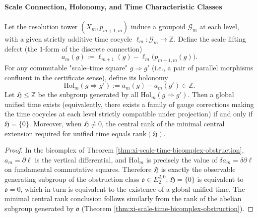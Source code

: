 \paragraph{Scale Connection, Holonomy, and Time Characteristic Classes}

\begin{theorem}\label{thm:xi-scale-time-connection-holonomy-criterion}
Let the resolution tower \((X_m,p_{m+1,m})\) induce a groupoid \(\mathcal G_m\) at each level, with a given strictly additive time cocycle \(\ell_m:\mathcal G_m\to\mathbb Z\).
Define the scale lifting defect (the \(1\)-form of the discrete connection)
\[
a_m(g):=\ell_{m+1}(g)-\ell_m\!\bigl(p_{m+1,m}(g)\bigr).
\]
For any commutable "scale--time square" \(g\Rightarrow g'\) (i.e., a pair of parallel morphisms confluent in the certificate sense), define its holonomy
\[
\mathrm{Hol}_m(g\Rightarrow g'):=a_m(g)-a_m(g')\in\mathbb Z.
\]
Let \(\mathfrak H\le \mathbb Z\) be the subgroup generated by all \(\mathrm{Hol}_m(g\Rightarrow g')\).
Then a global unified time exists (equivalently, there exists a family of gauge corrections making the time cocycles at each level strictly compatible under projection) if and only if \(\mathfrak H=\{0\}\).
Moreover, when \(\mathfrak H\neq 0\), the central rank of the minimal central extension required for unified time equals \(\mathrm{rank}(\mathfrak H)\).
\end{theorem}

\begin{proof}
In the bicomplex of Theorem \ref{thm:xi-scale-time-bicomplex-obstruction}, \(a_m=\partial\ell\) is the vertical differential, and \(\mathrm{Hol}_m\) is precisely the value of \(\delta a_m=\delta\partial\ell\) on fundamental commutative squares.
Therefore \(\mathfrak H\) is exactly the observable generating subgroup of the obstruction class \(\mathfrak o\in E_2^{2,0}\); \(\mathfrak H=\{0\}\) is equivalent to \(\mathfrak o=0\), which in turn is equivalent to the existence of a global unified time.
The minimal central rank conclusion follows similarly from the rank of the abelian subgroup generated by \(\mathfrak o\) (Theorem \ref{thm:xi-scale-time-bicomplex-obstruction}).
\end{proof}

